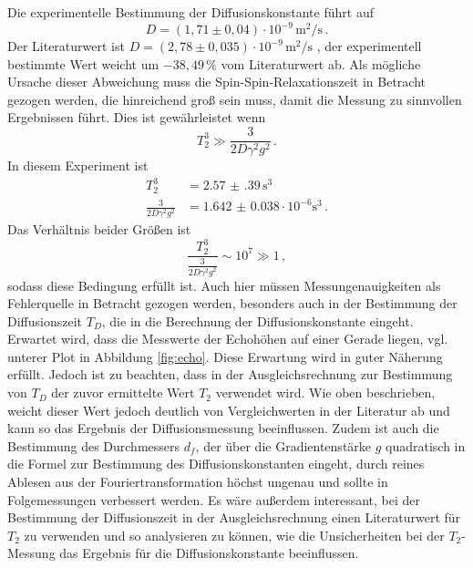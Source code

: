 Die experimentelle Bestimmung der Diffusionskonstante führt auf 
\begin{equation*}
    D = (1,71 \pm 0,04) \cdot 10^{-9} \, \text{m}^2/\text{s} \, .
\end{equation*}
Der Literaturwert ist $D = (2,78 \pm 0,035) \cdot 10^{-9} \, \text{m}^2/\text{s}$  \cite{Chang}, 
der experimentell bestimmte Wert weicht um $-38,49 \, \%$ vom Literaturwert ab.
Als mögliche Ursache dieser Abweichung muss die Spin-Spin-Relaxationszeit in Betracht gezogen werden, die 
hinreichend groß sein muss, damit die Messung zu sinnvollen Ergebnissen führt. Dies ist gewährleistet wenn 
\begin{equation*}
    T_2^3 \gg \frac{3}{2 D \gamma^2 g^2} \, .
\end{equation*}
In diesem Experiment ist 
\begin{align*}
    T_2^3 &= \num{2.57(39)} \, \text{s}^3 \\
    \frac{3}{2 D \gamma^2 g^2} &= \num{1.642(38)} \cdot 10^{-6} \text{s}^3 \, .
\end{align*}
Das Verhältnis beider Größen ist
\begin{equation*}
    \frac{T_2^3}{\frac{3}{2 D \gamma^2 g^2}} \sim 10^7 \gg 1 \, ,
\end{equation*}
sodass diese Bedingung erfüllt ist.
Auch hier müssen Messungenauigkeiten als Fehlerquelle in Betracht gezogen werden, besonders auch 
in der Bestimmung der Diffusionszeit $T_D$, die in die Berechnung der Diffusionskonstante eingeht. 
Erwartet wird, dass die Messwerte der Echohöhen auf einer Gerade liegen, vgl. unterer Plot in Abbildung \ref{fig:echo}.
Diese Erwartung wird in guter Näherung erfüllt.
Jedoch ist zu beachten, dass in der Ausgleichsrechnung zur Bestimmung von $T_D$ der zuvor ermittelte Wert $T_2$
verwendet wird. Wie oben beschrieben, weicht dieser Wert jedoch deutlich von Vergleichwerten 
in der Literatur ab und kann so das Ergebnis der Diffusionsmessung beeinflussen. Zudem ist auch die Bestimmung des Durchmessers 
$d_f$, der über die Gradientenstärke $g$ quadratisch in die Formel zur Bestimmung des 
Diffusionskonstanten eingeht, durch reines Ablesen aus der Fouriertransformation höchst ungenau und sollte 
in Folgemessungen verbessert werden. 
Es wäre außerdem interessant, bei der Bestimmung der Diffusionszeit
in der Ausgleichsrechnung einen Literaturwert für $T_2$ zu verwenden und so analysieren zu können, wie 
die Unsicherheiten bei der $T_2$-Messung das Ergebnis für die Diffusionskonstante beeinflussen.